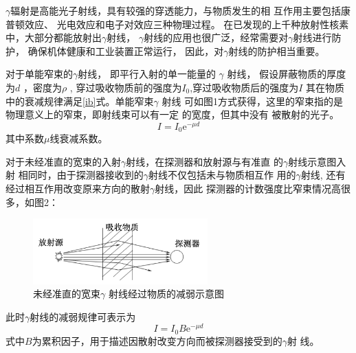 $ \gamma $辐射是高能光子射线，具有较强的穿透能力，与物质发生的相
互作用主要包括康普顿效应、
光电效应和电子对效应三种物理过程。
在已发现的上千种放射性核素中，大部分都能放射出$ \gamma $射线，
$\gamma$射线的应用也很广泛，经常需要对$\gamma$射线进行防护，
确保机体健康和工业装置正常运行，
因此，对$\gamma$射线的防护相当重要。

对于单能窄束的$ \gamma $射线，
即平行入射的单一能量的
$ \gamma $ 射线，
假设屏蔽物质的厚度为$ d $ ，密度为$ \rho $ ,
穿过吸收物质前的强度为$I_0$,穿过吸收物质后的强度为$I$
其在物质中的衰减规律满足\eqref{ib}式。单能窄束$ \gamma $ 射线
可如图1方式获得，这里的窄束指的是物理意义上的窄束，即射线束可以有一定
的宽度，但其中没有
被散射的光子。
    \begin{equation}
        I=I_0\mathrm{e}^{-\mu d}  \label{ib}
    \end{equation}
其中系数$\mu$线衰减系数。

对于未经准直的宽束的入射$\gamma$射线，在探测器和放射源与有准直
的$\gamma$射线示意图入射
相同时，由于探测器接收到的$\gamma$射线不仅包括未与物质相互作
用的$\gamma$射线,
还有经过相互作用改变原来方向的散射$\gamma$射线，因此
探测器的计数强度比窄束情况高很多，如图2：
\begin{figure}[h]
    \centering
    \includegraphics[width = 0.6\textwidth]{图片2.png}
    \caption{未经准直的宽束$ \gamma $ 射线经过物质的减弱示意图}
    \end{figure}

此时$\gamma$射线的减弱规律可表示为
\begin{equation}
    I=I_0B\mathrm{e}^{-\mu d}  \label{i}
\end{equation}
式中$B$为累积因子，用于描述因散射改变方向而被探测器接受到的$\gamma$射
线\cite{霍雷2015辐射剂量与防护}。

